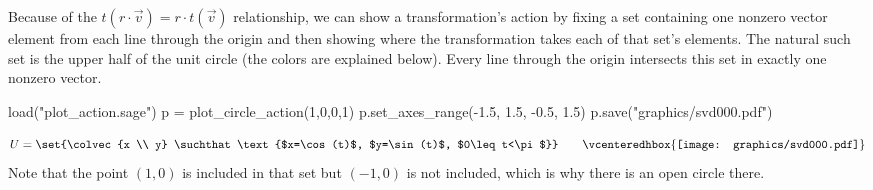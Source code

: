 Because of the $t(r\cdot\vec{v})=r\cdot t(\vec{v})$ relationship,
we can show a transformation's action by fixing 
a set containing one nonzero vector element from each line through the origin
and then showing where the transformation takes each of 
that set's elements.
The natural such set is the upper half of the unit circle
(the colors are explained below).
Every line through the origin intersects this set in exactly 
one nonzero vector.
\begin{sagesilent}
load("plot_action.sage")
p = plot_circle_action(1,0,0,1) 
p.set_axes_range(-1.5, 1.5, -0.5, 1.5) 
p.save("graphics/svd000.pdf")
\end{sagesilent}
\begin{equation*}
  U=\set{\colvec{x \\ y}
         \suchthat 
         \text{$x=\cos(t)$, $y=\sin(t)$, $0\leq t<\pi$}}
  \qquad
  \vcenteredhbox{\texttt{[image: graphics/svd000.pdf]}}  
\end{equation*}
Note that the point $(1,0)$ is included in that set but
$(-1,0)$ is not included, which is why there is an open circle
there.

